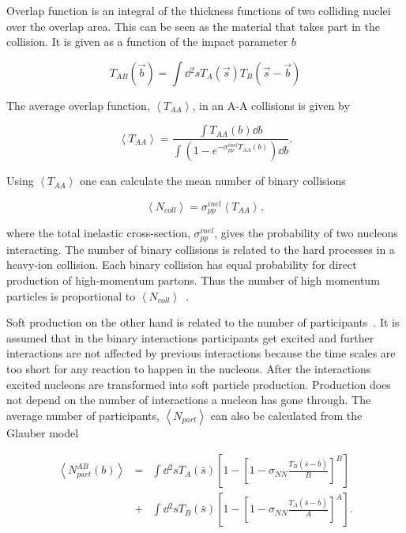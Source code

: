 Overlap function is an integral of the thickness functions of two colliding nuclei over the overlap area. This can be seen as the material that takes part in the collision. It is given as a function of the impact parameter $b$

\begin{equation}
T_{AB}\left(\vec b\right)=\int \dd{^2s} T_A\left(\vec s\right) T_B\left(\vec s - \vec b\right)
\end{equation}

\noindent The average overlap function, $\left<T_{AA}\right>$, in an A-A collisions  is given by~\cite{Afanasiev:2009aa}

\begin{equation}
\left<T_{AA}\right>=\frac{\int T_{AA}\left(b\right) \dd b}
{\int\left(1-e^{-\sigma^{inel}_{pp}T_{AA}\left(b\right)}\right)\dd b}.
\end{equation}

\noindent Using $\left<T_{AA}\right>$ one can calculate the mean number of binary collisions

\begin{equation}
\left<N_{coll}\right>=\sigma_{pp}^{inel}\left<T_{AA}\right>,
\end{equation}

\noindent where the total inelastic cross-section, $\sigma_{pp}^{inel}$, gives the probability of two nucleons interacting. The number of binary collisions is related to the hard processes in a heavy-ion collision. Each binary collision has equal probability for direct production of high-momentum partons. Thus the number of high momentum particles is proportional to $\left<N_{coll}\right>$~\cite{Abelev:2013qoq,Kharzeev:2004if,Deng:2010mv}.

Soft production on the other hand is related to the number of participants~\cite{Kharzeev:2004if}. It is assumed that in the binary interactions participants get excited and further interactions are not affected by previous interactions because the time scales are too short for any reaction to happen in the nucleons. After the interactions excited nucleons are transformed into soft particle production. Production does not depend on the number of interactions a nucleon has gone through. The average number of participants, $\left<N_{part}\right>$ can also be calculated from the Glauber model 


\begin{eqnarray}
\left<N_{part}^{AB}\left(b\right)\right>&=&\int \dd{^2s} T_A\left(\bar s\right)\left[1-\left[1-\sigma_{NN}\frac{T_B\left(\bar s - \bar b\right)}{B}\right]^B\right] \nonumber \\
 &+ &\int \dd{^2 s} T_B\left(\bar s\right)\left[1-\left[1-\sigma_{NN}\frac{T_A\left(\bar s - \bar b\right)}{A}\right]^A\right].
\end{eqnarray}

